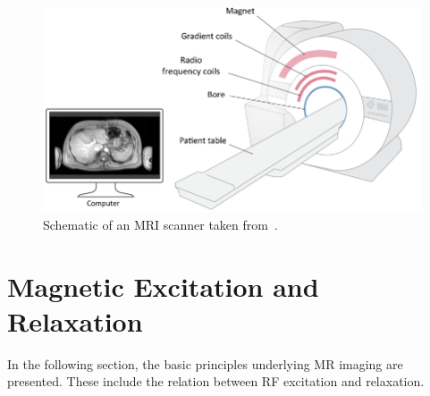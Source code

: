 \documentclass[english,version-2022-01]{uzl-thesis} %
\begin{document}
\begin{figure}[htpb]
 	\centering
 	\graphicspath{{images/}{\main/images/}}
 	\includegraphics[width=\linewidth]{MRI-Schematic.png} 
 	\caption{Schematic of an MRI scanner taken from~\cite{Serai2021}.}
 	\label{fig:MRISchematic}
 \end{figure} 

\section{Magnetic Excitation and Relaxation} \label{Sec:MagneticExcitationAndRelaxation}
In the following section, the basic principles underlying MR imaging are presented. These include the relation between RF excitation and relaxation.
\end{document}
